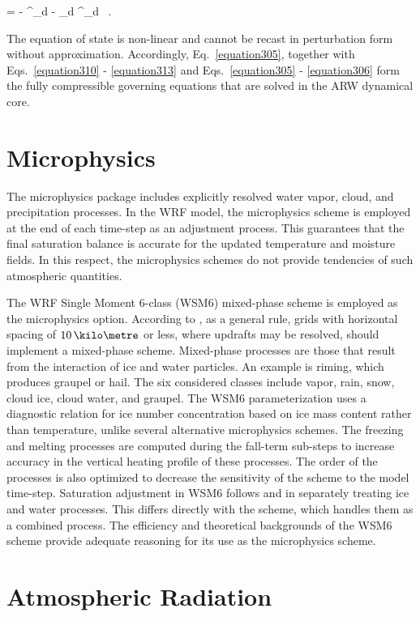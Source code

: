 \be
\pd{\phi^{\prime}}{\eta} = - \alpha^{\prime}_d - \alpha_d \mu^{\prime}_d \, . \label{equation314}
\ee


The equation of state is non-linear and cannot be recast in perturbation form without approximation. Accordingly, Eq.~\eqref{equation305}, together with Eqs.~\eqref{equation310} - \eqref{equation313} and Eqs.~\eqref{equation305} - \eqref{equation306} form the fully compressible governing equations that are solved in the ARW dynamical core.

\section{Microphysics}
\label{mp-32}

The microphysics package includes explicitly resolved water vapor, cloud, and precipitation processes. In the WRF model, the microphysics scheme is employed at the end of each time-step as an adjustment process. This guarantees that the final saturation balance is accurate for the updated temperature and moisture fields. In this respect, the microphysics schemes do not provide tendencies of such atmospheric quantities.

The WRF Single Moment 6-class (WSM6) mixed-phase scheme is employed as the microphysics option. According to  \citet{Skamarock}, as a general rule, grids with horizontal spacing of $10\, \kilo\metre$ or less, where updrafts may be resolved, should implement a mixed-phase scheme. Mixed-phase processes are those that result from the interaction of ice and water particles. An example is riming, which produces graupel or hail. The six considered classes include vapor, rain, snow, cloud ice, cloud water, and graupel. The WSM6 parameterization uses a diagnostic relation for ice number concentration based on ice mass content rather than temperature, unlike several alternative microphysics schemes. The freezing and melting processes are computed during the fall-term sub-steps to increase accuracy in the vertical heating profile of these processes. The order of the processes is also optimized to decrease the sensitivity of the scheme to the model time-step. Saturation adjustment in WSM6 follows  \citet{Dud89} and  \citet{Hong98} in separately treating ice and water processes. This differs directly with the \citet{Lin} scheme, which handles them as a combined process. The efficiency and theoretical backgrounds of the WSM6 scheme provide adequate reasoning for its use as the microphysics scheme.

\section{Atmospheric Radiation}
\label{ar-33}

